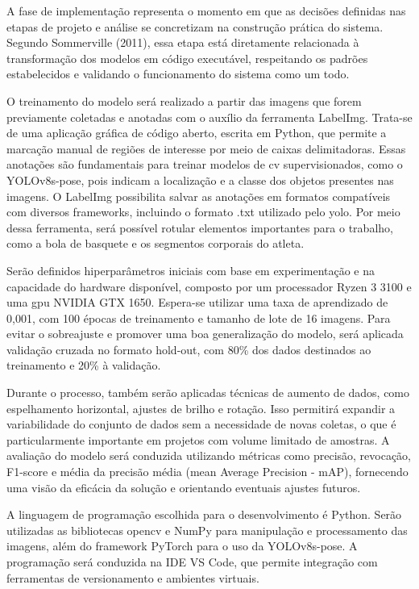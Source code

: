 \label{sssec:implementação}


A fase de implementação representa o momento em que as decisões definidas nas etapas de projeto e análise se concretizam na construção prática do sistema. 
Segundo Sommerville (2011), essa etapa está diretamente relacionada à transformação dos modelos em código executável, respeitando os padrões estabelecidos e validando o funcionamento do sistema como um todo. 

O treinamento do modelo será realizado a partir das imagens que forem previamente coletadas e anotadas com o auxílio da ferramenta LabelImg. 
Trata-se de uma aplicação gráfica de código aberto, escrita em Python, que permite a marcação manual de regiões de interesse por meio de caixas delimitadoras. 
Essas anotações são fundamentais para treinar modelos de \ac{cv} supervisionados, como o YOLOv8s-pose, pois indicam a localização e a classe dos objetos presentes nas imagens. 
O LabelImg possibilita salvar as anotações em formatos compatíveis com diversos frameworks, incluindo o formato .txt utilizado pelo \ac{yolo}. 
Por meio dessa ferramenta, será possível rotular elementos importantes para o trabalho, como a bola de basquete e os segmentos corporais do atleta.

Serão definidos hiperparâmetros iniciais com base em experimentação e na capacidade do hardware disponível, composto por um processador Ryzen 3 3100 e uma \ac{gpu} NVIDIA GTX 1650. 
Espera-se utilizar uma taxa de aprendizado de 0{,}001, com 100 épocas de treinamento e tamanho de lote de 16 imagens. 
Para evitar o sobreajuste e promover uma boa generalização do modelo, será aplicada validação cruzada no formato hold-out, com 80\% dos dados destinados ao treinamento e 20\% à validação.

Durante o processo, também serão aplicadas técnicas de aumento de dados, como espelhamento horizontal, ajustes de brilho e rotação. 
Isso permitirá expandir a variabilidade do conjunto de dados sem a necessidade de novas coletas, o que é particularmente importante em projetos com volume limitado de amostras. 
A avaliação do modelo será conduzida utilizando métricas como precisão, revocação, F1-score e média da precisão média (mean Average Precision - mAP), fornecendo uma visão da eficácia da solução e orientando eventuais ajustes futuros.

A linguagem de programação escolhida para o desenvolvimento é Python. 
Serão utilizadas as bibliotecas \ac{opencv} e NumPy para manipulação e processamento das imagens, além do framework PyTorch para o uso da YOLOv8s-pose. 
A programação será conduzida na IDE VS Code, que permite integração com ferramentas de versionamento e ambientes virtuais.

